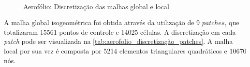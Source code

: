 \begin{figure}[!htbp]
	\caption{Aerofólio: Discretização das malhas global e local}
	\centering
	\\
	\label{fig:aerofolio_malhaArlequin_detalheLocal}
\end{figure}

A malha global isogeométrica foi obtida através da utilização de 9 $patches$, que totalizaram 15561 pontos de controle e 14025 células. A discretização em cada \textit{patch} pode ser visualizada na \autoref{tab:aerofolio_discretização_patches}. A malha local por sua vez é composta por 5214 elementos triangulares quadráticos e 10670 nós. 

